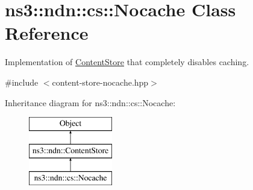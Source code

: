 \hypertarget{classns3_1_1ndn_1_1cs_1_1Nocache}{}\section{ns3\+:\+:ndn\+:\+:cs\+:\+:Nocache Class Reference}
\label{classns3_1_1ndn_1_1cs_1_1Nocache}


Implementation of \hyperlink{classns3_1_1ndn_1_1ContentStore}{Content\+Store} that completely disables caching.  




{\ttfamily \#include $<$content-\/store-\/nocache.\+hpp$>$}

Inheritance diagram for ns3\+:\+:ndn\+:\+:cs\+:\+:Nocache\+:\begin{figure}[H]
\begin{center}
\leavevmode
\includegraphics[height=3.000000cm]{classns3_1_1ndn_1_1cs_1_1Nocache}
\end{center}
\end{figure}

